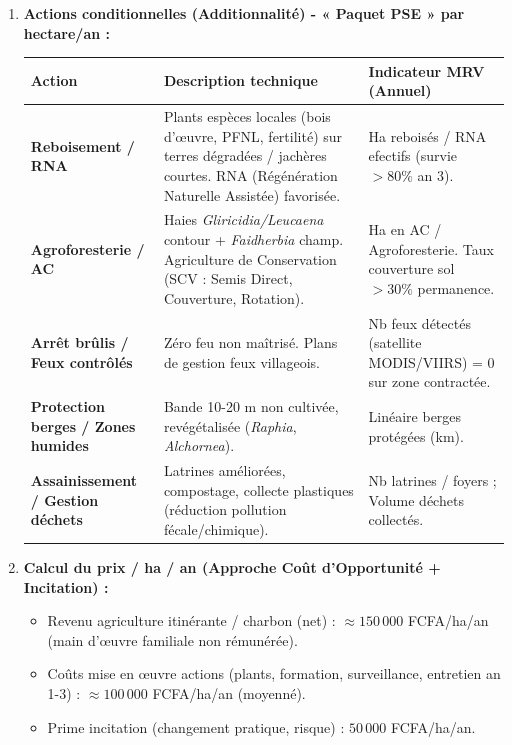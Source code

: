 \documentclass[11pt]{article}
\begin{document}
\begin{exoresolu}
\begin{enumerate}
\begin{itemize}
        \end{itemize}
        \item \textbf{Actions conditionnelles (Additionnalité) - « Paquet PSE » par hectare/an :}
        \begin{center}
            \begin{tabularx}{\linewidth}{|l|X|l|}\hline
            \rowcolor{popblueL}
            \textbf{Action} & \textbf{Description technique} & \textbf{Indicateur MRV (Annuel)} \\ \hline
            \textbf{Reboisement / RNA} & Plants espèces locales (bois d'œuvre, PFNL, fertilité) sur terres dégradées / jachères courtes. RNA (Régénération Naturelle Assistée) favorisée. & Ha reboisés / RNA efectifs (survie $> 80\%$ an 3). \\ \hline
            \textbf{Agroforesterie / AC} & Haies \emph{Gliricidia/Leucaena} contour + \emph{Faidherbia} champ. Agriculture de Conservation (SCV : Semis Direct, Couverture, Rotation). & Ha en AC / Agroforesterie. Taux couverture sol $> 30\%$ permanence. \\ \hline
            \textbf{Arrêt brûlis / Feux contrôlés} & Zéro feu non maîtrisé. Plans de gestion feux villageois. & Nb feux détectés (satellite MODIS/VIIRS) = 0 sur zone contractée. \\ \hline
            \textbf{Protection berges / Zones humides} & Bande 10-20 m non cultivée, revégétalisée (\emph{Raphia}, \emph{Alchornea}). & Linéaire berges protégées (km). \\ \hline
            \textbf{Assainissement / Gestion déchets} & Latrines améliorées, compostage, collecte plastiques (réduction pollution fécale/chimique). & Nb latrines / foyers ; Volume déchets collectés. \\ \hline
        \end{tabularx}
    \end{center}
        \item \textbf{Calcul du prix / ha / an (Approche Coût d'Opportunité + Incitation) :}
        \begin{itemize}
            \item Revenu agriculture itinérante / charbon (net) : $\approx 150\,000$ FCFA/ha/an (main d'œuvre familiale non rémunérée).
            \item Coûts mise en œuvre actions (plants, formation, surveillance, entretien an 1-3) : $\approx 100\,000$ FCFA/ha/an (moyenné).
            \item Prime incitation (changement pratique, risque) : $50\,000$ FCFA/ha/an.

\end{itemize}
\end{enumerate}
\end{exoresolu}
\end{document}

